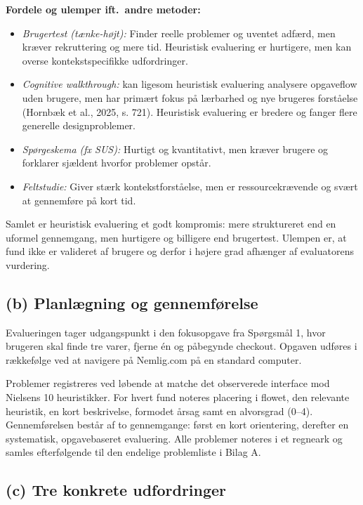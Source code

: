 \documentclass[12pt,a4paper]{article}
\begin{document}
\textbf{Fordele og ulemper ift.\ andre metoder:} \begin{itemize}[leftmargin=*,itemsep=0.3em] \item \textit{Brugertest (tænke-højt):} Finder reelle problemer og uventet adfærd, men kræver rekruttering og mere tid. Heuristisk evaluering er hurtigere, men kan overse kontekstspecifikke udfordringer. \item \textit{Cognitive walkthrough:} kan ligesom heuristisk evaluering analysere opgaveflow uden brugere, men har primært fokus på lærbarhed og nye brugeres forståelse (Hornbæk et al., 2025, s. 721). Heuristisk evaluering er bredere og fanger flere generelle designproblemer. \item \textit{Spørgeskema (fx SUS):} Hurtigt og kvantitativt, men kræver brugere og forklarer sjældent hvorfor problemer opstår. \item \textit{Feltstudie:} Giver stærk kontekstforståelse, men er ressourcekrævende og svært at gennemføre på kort tid. \end{itemize}

Samlet er heuristisk evaluering et godt kompromis: mere struktureret end en uformel gennemgang, men hurtigere og billigere end brugertest. Ulempen er, at fund ikke er valideret af brugere og derfor i højere grad afhænger af evaluatorens vurdering.

\subsection*{(b) Planlægning og gennemførelse}

Evalueringen tager udgangspunkt i den fokusopgave fra Spørgsmål 1, hvor brugeren skal finde tre varer, fjerne én og påbegynde checkout. Opgaven udføres i rækkefølge ved at navigere på Nemlig.com på en standard computer.

Problemer registreres ved løbende at matche det observerede interface mod Nielsens 10 heuristikker. For hvert fund noteres placering i flowet, den relevante heuristik, en kort beskrivelse, formodet årsag samt en alvorsgrad (0–4).
Gennemførelsen består af to gennemgange: først en kort orientering, derefter en systematisk, opgavebaseret evaluering. Alle problemer noteres i et regneark og samles efterfølgende til den endelige problemliste i Bilag A.

\subsection*{(c) Tre konkrete udfordringer}
\end{document}
